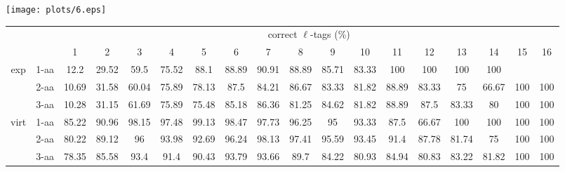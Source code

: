 \documentclass{article}
\begin{document}
\texttt{[image: plots/6.eps]}\begin{table}[h]\tiny
\vspace{3mm}
{\centering
\begin{center}
\begin{tabular}{|c|l|c|c|c|c|c|c|c|c|c|c|c|c|c|c|c|c|}
  \hline
  \multicolumn{2}{|c|}{ } & \multicolumn{ 16 }{|c|}{ correct $\ell$-tags (\%)} \\
  \cline{3- 18}
  \multicolumn{2}{|c|}{ }  & 1 & 2 & 3 & 4 & 5 & 6 & 7 & 8 & 9 & 10 & 11 & 12 & 13 & 14 & 15 & 16\\
  \hline
  \multirow{3}{*}{exp}
&  1-aa  & 12.2 & 29.52 & 59.5 & 75.52 & 88.1 & 88.89 & 90.91 & 88.89 & 85.71 & 83.33 & 100 & 100 & 100 & 100 &  & \\&  2-aa  & 10.69 & 31.58 & 60.04 & 75.89 & 78.13 & 87.5 & 84.21 & 86.67 & 83.33 & 81.82 & 88.89 & 83.33 & 75 & 66.67 & 100 & 100\\&  3-aa  & 10.28 & 31.15 & 61.69 & 75.89 & 75.48 & 85.18 & 86.36 & 81.25 & 84.62 & 81.82 & 88.89 & 87.5 & 83.33 & 80 & 100 & 100\\ \hline
  \multirow{3}{*}{virt} 
&  1-aa  & 85.22 & 90.96 & 98.15 & 97.48 & 99.13 & 98.47 & 97.73 & 96.25 & 95 & 93.33 & 87.5 & 66.67 & 100 & 100 & 100 & 100\\&  2-aa  & 80.22 & 89.12 & 96 & 93.98 & 92.69 & 96.24 & 98.13 & 97.41 & 95.59 & 93.45 & 91.4 & 87.78 & 81.74 & 75 & 100 & 100\\&  3-aa  & 78.35 & 85.58 & 93.4 & 91.4 & 90.43 & 93.79 & 93.66 & 89.7 & 84.22 & 80.93 & 84.94 & 80.83 & 83.22 & 81.82 & 100 & 100\\ \hline
\end{tabular}
\end{center}
\par}
\centering
\vspace{3mm}
\label{table:table6}
\end{table}
\end{document}
